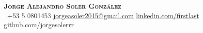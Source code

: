 \begin{center}
    \textbf{\Huge \scshape Jorge Alejandro Soler González} \\ \vspace{1pt}
     \ \small +53 5 0801453 \quad
    \href{mailto:jorgeasoler2015@gmail.com}{ \underline{jorgeasoler2015@gmail.com}} \quad
    \href{https://www.linkedin.com/in/}{ \underline{linkedin.com/firstlast}} \quad
    \href{https://github.com/jorgesolerrr}{ \underline{github.com/jorgesolerrr}}
\end{center}